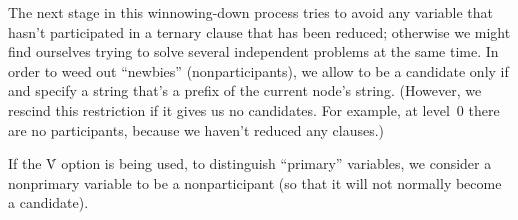 The next stage in this winnowing-down process tries to avoid any variable
that hasn't participated in a ternary clause that has been reduced;
otherwise we might find ourselves trying to solve several independent
problems at the same time. In order to weed out ``newbies'' (nonparticipants),
we allow  to be a candidate only if  and %
specify a string that's a prefix of the current node's string.
(However, we rescind this restriction if it gives us no candidates. For
example, at level~0 there are no participants, because we haven't reduced any
clauses.)

If the \.V option is being used, to distinguish ``primary'' variables,
we consider a nonprimary variable to be a nonparticipant (so that it
will not normally become a candidate).

